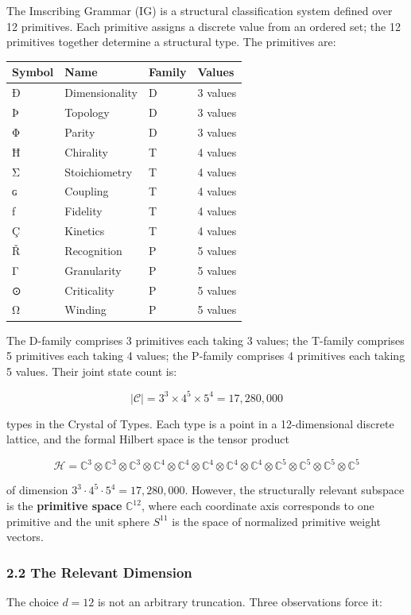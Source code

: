 \documentclass[12pt,a4paper]{article}
\begin{document}
The Imscribing Grammar (IG) is a structural classification system
defined over 12 primitives. Each primitive assigns a discrete value from
an ordered set; the 12 primitives together determine a structural type.
The primitives are:

\begin{longtable}[]{@{}llll@{}}
\toprule
Symbol & Name & Family & Values\tabularnewline
\midrule
\endhead
Ð & Dimensionality & D & 3 values\tabularnewline
Þ & Topology & D & 3 values\tabularnewline
Φ & Parity & D & 3 values\tabularnewline
Ħ & Chirality & T & 4 values\tabularnewline
Σ & Stoichiometry & T & 4 values\tabularnewline
ɢ & Coupling & T & 4 values\tabularnewline
ƒ & Fidelity & T & 4 values\tabularnewline
Ç & Kinetics & T & 4 values\tabularnewline
Ř & Recognition & P & 5 values\tabularnewline
Γ & Granularity & P & 5 values\tabularnewline
⊙ & Criticality & P & 5 values\tabularnewline
Ω & Winding & P & 5 values\tabularnewline
\bottomrule
\end{longtable}

The D-family comprises 3 primitives each taking 3 values; the T-family
comprises 5 primitives each taking 4 values; the P-family comprises 4
primitives each taking 5 values. Their joint state count is:

\[|\mathcal{C}| = 3^3 \times 4^5 \times 5^4 = 17{,}280{,}000\]

types in the Crystal of Types. Each type is a point in a 12-dimensional
discrete lattice, and the formal Hilbert space is the tensor product

\[\mathcal{H} = \mathbb{C}^3 \otimes \mathbb{C}^3 \otimes \mathbb{C}^3 \otimes \mathbb{C}^4 \otimes \mathbb{C}^4 \otimes \mathbb{C}^4 \otimes \mathbb{C}^4 \otimes \mathbb{C}^4 \otimes \mathbb{C}^5 \otimes \mathbb{C}^5 \otimes \mathbb{C}^5 \otimes \mathbb{C}^5\]

of dimension \(3^3 \cdot 4^5 \cdot 5^4 = 17{,}280{,}000\). However, the
structurally relevant subspace is the \textbf{primitive space}
\(\mathbb{C}^{12}\), where each coordinate axis corresponds to one
primitive and the unit sphere \(S^{11}\) is the space of normalized
primitive weight vectors.

\hypertarget{the-relevant-dimension}{%
\subsubsection{2.2 The Relevant
Dimension}\label{the-relevant-dimension}}

The choice \(d = 12\) is not an arbitrary truncation. Three observations
force it:
\end{document}
